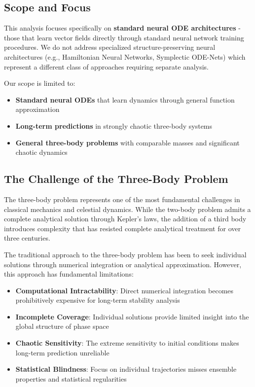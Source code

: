 \documentclass[11pt,a4paper]{article}
\newcommand{\threeprob}{three-body problem}
\begin{document}
\subsection{Scope and Focus}
This analysis focuses specifically on \textbf{standard neural ODE architectures} - those that learn vector fields directly through standard neural network training procedures. We do not address specialized structure-preserving neural architectures (e.g., Hamiltonian Neural Networks, Symplectic ODE-Nets) which represent a different class of approaches requiring separate analysis.

Our scope is limited to:
\begin{itemize}
    \item \textbf{Standard neural ODEs} that learn dynamics through general function approximation
    \item \textbf{Long-term predictions} in strongly chaotic three-body systems
    \item \textbf{General three-body problems} with comparable masses and significant chaotic dynamics
\end{itemize}

\subsection{The Challenge of the Three-Body Problem}

The \threeprob{} represents one of the most fundamental challenges in classical mechanics and celestial dynamics. While the two-body problem admits a complete analytical solution through Kepler's laws, the addition of a third body introduces complexity that has resisted complete analytical treatment for over three centuries.

The traditional approach to the \threeprob{} has been to seek individual solutions through numerical integration or analytical approximation. However, this approach has fundamental limitations:

\begin{itemize}
    \item \textbf{Computational Intractability}: Direct numerical integration becomes prohibitively expensive for long-term stability analysis
    \item \textbf{Incomplete Coverage}: Individual solutions provide limited insight into the global structure of phase space
    \item \textbf{Chaotic Sensitivity}: The extreme sensitivity to initial conditions makes long-term prediction unreliable
    \item \textbf{Statistical Blindness}: Focus on individual trajectories misses ensemble properties and statistical regularities
\end{itemize}
\end{document}
